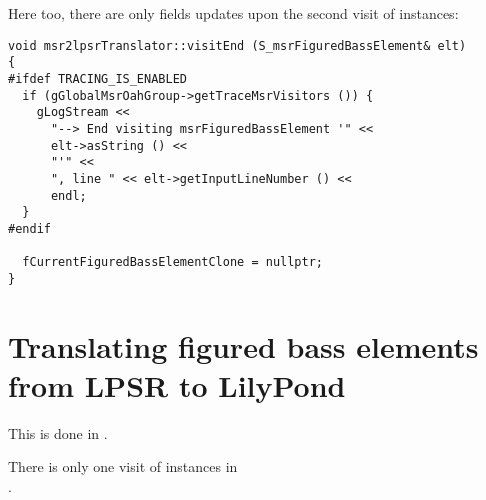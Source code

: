 Here too, there are only fields updates upon the second visit of  instances:
\begin{lstlisting}[language=CPlusPlus]
void msr2lpsrTranslator::visitEnd (S_msrFiguredBassElement& elt)
{
#ifdef TRACING_IS_ENABLED
  if (gGlobalMsrOahGroup->getTraceMsrVisitors ()) {
    gLogStream <<
      "--> End visiting msrFiguredBassElement '" <<
      elt->asString () <<
      "'" <<
      ", line " << elt->getInputLineNumber () <<
      endl;
  }
#endif

  fCurrentFiguredBassElementClone = nullptr;
}
\end{lstlisting}


\section{Translating figured bass elements from LPSR to LilyPond}

This is done in \lpsrToLilypond{}.

There is only one visit of  instances in\\
.

